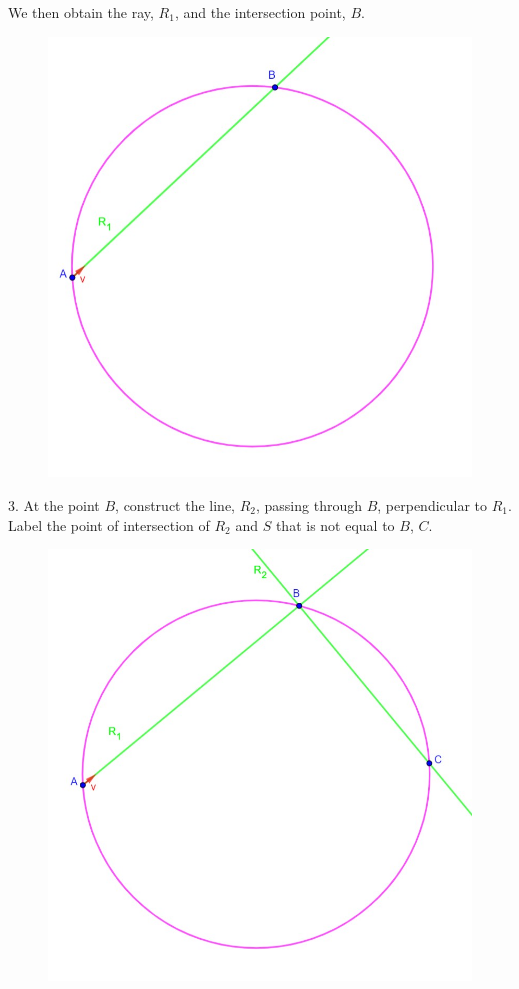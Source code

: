 \documentclass[11pt]{amsart}
\theoremstyle{plain}
\theoremstyle{definition}
\theoremstyle{remark}
\begin{document}
We then obtain the ray, \(R_1\), and the intersection point, \(B\).  
\begin{center}
	\begin{figure}[h]
		\includegraphics[scale=0.5]{circle_4.jpg}
	\end{figure}
\end{center}
3. At the point \(B\), construct the line, \(R_2\), passing through
\(B\), perpendicular to \(R_1\). Label the point of intersection of
\(R_2\) and \(S\) that is not equal to \(B\), \(C\).
\begin{center}
	\begin{figure}[h]
		\includegraphics[scale=0.5]{circle_5.jpg}
	\end{figure}
\end{center}
\end{document}
